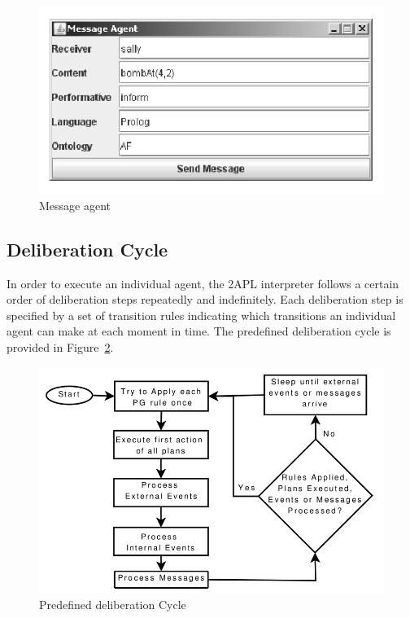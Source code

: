 \documentclass[a4paper]{article}
\begin{document}
\begin{figure}[htp]
\centering
\includegraphics[keepaspectratio,scale=0.65]{fig/messageagent.png}
\caption{Message agent}
\label{fig:message_agent}
\end{figure}

\subsection{Deliberation Cycle} %

In order to execute an individual agent, the 2APL interpreter follows a certain order of deliberation steps repeatedly and indefinitely. Each deliberation step is specified by a set of transition rules indicating which transitions an individual agent can make at each moment in time. The predefined deliberation cycle is provided in Figure~\ref{fig:deliberation_cycle}.

\begin{figure}[htp]
\centering
\includegraphics[keepaspectratio,scale=0.35]{fig/rcycle.png}
\caption{Predefined deliberation Cycle}
\label{fig:deliberation_cycle}
\end{figure}
 
\end{document}
